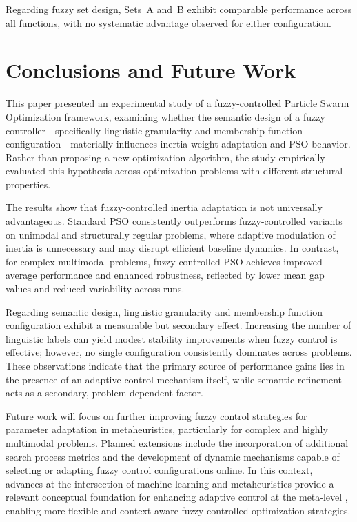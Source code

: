 \documentclass[runningheads]{llncs}
\begin{document}
Regarding fuzzy set design, Sets~A and~B exhibit comparable performance across all functions, with no systematic advantage observed for either configuration.




\section{Conclusions and Future Work}
\label{sec:conclusiones}

This paper presented an experimental study of a fuzzy-controlled Particle Swarm Optimization framework, examining whether the semantic design of a fuzzy controller—specifically linguistic granularity and membership function configuration—materially influences inertia weight adaptation and PSO behavior. Rather than proposing a new optimization algorithm, the study empirically evaluated this hypothesis across optimization problems with different structural properties.

The results show that fuzzy-controlled inertia adaptation is not universally advantageous. Standard PSO consistently outperforms fuzzy-controlled variants on unimodal and structurally regular problems, where adaptive modulation of inertia is unnecessary and may disrupt efficient baseline dynamics. In contrast, for complex multimodal problems, fuzzy-controlled PSO achieves improved average performance and enhanced robustness, reflected by lower mean gap values and reduced variability across runs.

Regarding semantic design, linguistic granularity and membership function configuration exhibit a measurable but secondary effect. Increasing the number of linguistic labels can yield modest stability improvements when fuzzy control is effective; however, no single configuration consistently dominates across problems. These observations indicate that the primary source of performance gains lies in the presence of an adaptive control mechanism itself, while semantic refinement acts as a secondary, problem-dependent factor.

Future work will focus on further improving fuzzy control strategies for parameter adaptation in metaheuristics, particularly for complex and highly multimodal problems. Planned extensions include the incorporation of additional search process metrics and the development of dynamic mechanisms capable of selecting or adapting fuzzy control configurations online. In this context, advances at the intersection of machine learning and metaheuristics provide a relevant conceptual foundation for enhancing adaptive control at the meta-level \cite{karimi2022machine}, enabling more flexible and context-aware fuzzy-controlled optimization strategies.
\end{document}
